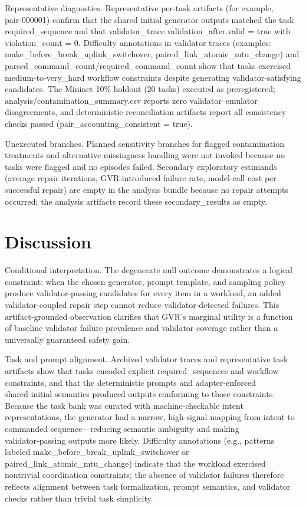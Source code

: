 \documentclass[conference]{IEEEtran}
\begin{document}
Representative diagnostics. Representative per‑task artifacts (for example, pair‑000001) confirm that the shared initial generator outputs matched the task required\_sequence and that validator\_trace.validation\_after.valid = true with violation\_count = 0. Difficulty annotations in validator traces (examples: make\_before\_break\_uplink\_switchover, paired\_link\_atomic\_mtu\_change) and parsed\_command\_count/required\_command\_count show that tasks exercised medium‑to‑very\_hard workflow constraints despite generating validator‑satisfying candidates. The Mininet 10\% holdout (20 tasks) executed as preregistered; analysis/contamination\_summary.csv reports zero validator--emulator disagreements, and deterministic reconciliation artifacts report all consistency checks passed (pair\_accounting\_consistent = true).

Unexecuted branches. Planned sensitivity branches for flagged contamination treatments and alternative missingness handling were not invoked because no tasks were flagged and no episodes failed. Secondary exploratory estimands (average repair iterations, GVR‑introduced failure rate, model‑call cost per successful repair) are empty in the analysis bundle because no repair attempts occurred; the analysis artifacts record these secondary\_results as empty.

\section{Discussion}
Conditional interpretation. The degenerate null outcome demonstrates a logical constraint: when the chosen generator, prompt template, and sampling policy produce validator‑passing candidates for every item in a workload, an added validator‑coupled repair step cannot reduce validator‑detected failures. This artifact‑grounded observation clarifies that GVR's marginal utility is a function of baseline validator failure prevalence and validator coverage rather than a universally guaranteed safety gain.

Task and prompt alignment. Archived validator traces and representative task artifacts show that tasks encoded explicit required\_sequences and workflow constraints, and that the deterministic prompts and adapter‑enforced shared‑initial semantics produced outputs conforming to those constraints. Because the task bank was curated with machine‑checkable intent representations, the generator had a narrow, high‑signal mapping from intent to commanded sequence---reducing semantic ambiguity and making validator‑passing outputs more likely. Difficulty annotations (e.g., patterns labeled make\_before\_break\_uplink\_switchover or paired\_link\_atomic\_mtu\_change) indicate that the workload exercised nontrivial coordination constraints; the absence of validator failures therefore reflects alignment between task formalization, prompt semantics, and validator checks rather than trivial task simplicity.
\end{document}
